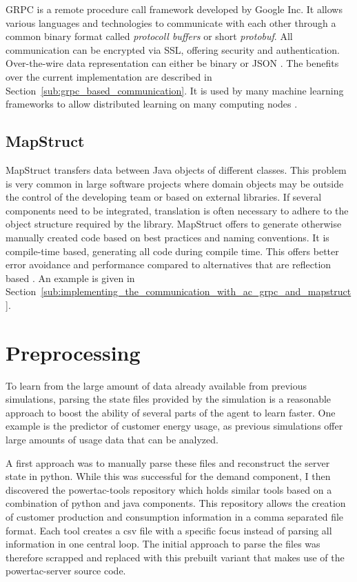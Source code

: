 \acf {GRPC} is a remote procedure call framework developed by Google Inc. It allows various languages and technologies to
communicate with each other through a common binary format called \emph{protocoll buffers} or short \emph{protobuf}. All communication can be encrypted via SSL, offering
security and authentication. Over-the-wire data representation can either be binary or \ac{JSON}
\citep[]{grpc}. The benefits over the
current implementation are described in Section~\ref{sub:grpc_based_communication}. It is used by many machine learning
frameworks to allow distributed learning on many computing nodes \cite[]{tensorflow2015-whitepaper}.


\subsection{MapStruct}%
\label{sub:mapstruct}

MapStruct transfers data between Java objects of different classes. This problem is very common in large
software projects where domain objects may be outside the control of the developing team or based on external libraries.
If several components need to be integrated, translation is often necessary to adhere to the object structure required
by the library. MapStruct offers to generate otherwise manually created code based on best practices and naming
conventions. It is compile-time based, generating all code during compile time. This offers better error avoidance and
performance compared to alternatives that are reflection based
\citep[]{mapstruct}.
An example is given in Section~\ref{sub:implementing_the_communication_with_ac_grpc_and_mapstruct}.




\section{Preprocessing}
\label{sec:preprocessing}

To learn from the large amount of data already available from previous simulations, parsing the state files provided by
the simulation is a reasonable approach to boost the ability of several parts of the agent to learn faster. One example
is the predictor of customer energy usage, as previous simulations offer large amounts of usage data that can be
analyzed.

A first approach was to manually parse these files and reconstruct the server state in python.
While this was successful for the demand component, I then discovered the powertac-tools repository which holds similar tools
based on a combination of python and java components. This repository allows the creation of customer production and
consumption information in a comma separated file format. Each tool creates a csv file with a specific focus instead of
parsing all information in one central loop. The initial approach to parse the files was therefore scrapped
and replaced with this prebuilt variant that makes use of the powertac-server source code. 

